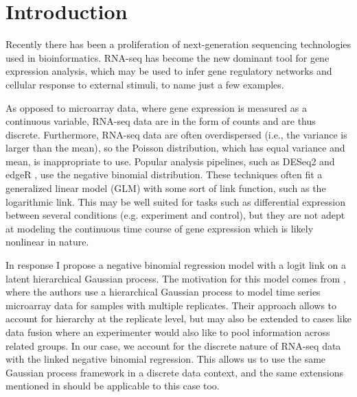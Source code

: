 \documentclass[11pt]{article}
\newcommand{\1}{\mathbf{1}}
\newcommand{\0}{\mathbf{0}}
\begin{document}
\section{Introduction}
Recently there has been a proliferation of next-generation sequencing technologies used in bioinformatics. RNA-seq has become the new dominant tool for gene expression analysis, which may be used to infer gene regulatory networks and cellular response to external stimuli, to name just a few examples. 

As opposed to microarray data, where gene expression is measured as a continuous variable, RNA-seq data are in the form of counts and are thus discrete. Furthermore, RNA-seq data are often overdispersed (i.e., the variance is larger than the mean), so the Poisson distribution, which has equal variance and mean, is inappropriate to use. Popular analysis pipelines, such as DESeq2 \cite{DESeq2} and edgeR \cite{edgeR}, use the negative binomial distribution. These techniques often fit a generalized linear model (GLM) with some sort of link function, such as the logarithmic link. This may be well suited for tasks such as differential expression between several conditions (e.g. experiment and control), but they are not adept at modeling the continuous time course of gene expression which is likely nonlinear in nature.

In response I propose a negative binomial regression model with a logit link on a latent hierarchical Gaussian process. The motivation for this model comes from \cite{GPmicroarray}, where the authors use a hierarchical Gaussian process to model time series microarray data for samples with multiple replicates. Their approach allows to account for hierarchy at the replicate level, but may also be extended to cases like data fusion where an experimenter would also like to pool information across related groups. In our case, we account for the discrete nature of RNA-seq data with the linked negative binomial regression. This allows us to use the same Gaussian process framework in a discrete data context, and the same extensions mentioned in \cite{GPmicroarray} should be applicable to this case too.

\end{document}
